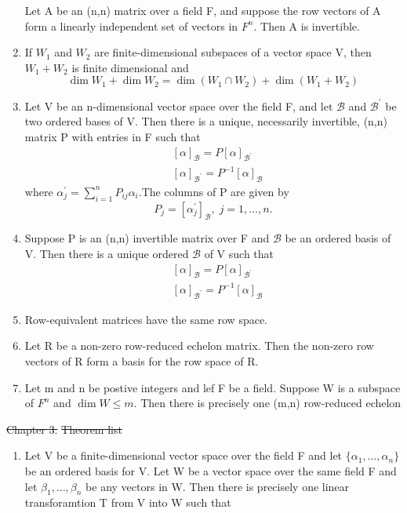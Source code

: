\documentclass[12pt, a4paper]{article}
\begin{document}
\begin{CJK*}{UTF8}{bsmi}
\begin{enumerate}
     Let A be an (n,n) matrix over a field F, and suppose the row vectors of A form a linearly independent set of vectors in \(F^n\). Then A is invertible.
    \item If \(W_1\) and \(W_2\) are finite-dimensional subspaces of a vector space V, then \(W_1+W_2\) is finite dimensional and \begin{equation}
        \dim W_1 + \dim W_2 = \dim{(W_1 \cap W_2)} + \dim(W_1+W_2) 
    \end{equation}
    \item Let V be an n-dimensional vector space over the field F, and let \(\mathscr{B}\) and \(\mathscr{B}^\prime\) be two ordered bases of V. Then there is a unique, necessarily invertible, (n,n) matrix P with entries in F such that\begin{align}
        &[\alpha]_\mathscr{B} = P [\alpha]_{\mathscr{B^\prime}}\\
        &[\alpha]_\mathscr{B^\prime} = P^{-1} [\alpha]_{\mathscr{B}}
    \end{align}
    where \(\alpha_j^\prime =\sum\limits_{i=1}^n P_{ij} \alpha_i\).The columns of P are given by\begin{equation}
        P_j = [\alpha_j^\prime]_{\mathscr{B}}, \; j=1,\ldots,n.
    \end{equation}
    \item Suppose P is an (n,n) invertible matrix over F and \(\mathscr{B}\) be an ordered basis of V. Then there is a unique ordered \(\mathscr{B}\) of V such that \begin{align}
        &[\alpha]_{\mathscr{B}} = P[\alpha]_{\mathscr{B^\prime}}\\
        &[\alpha]_{\mathscr{B^{\prime}}} = P^{-1}[\alpha]_{\mathscr{B}}
    \end{align}
    \item Row-equivalent matrices have the same row space.
    \item Let R be a non-zero row-reduced echelon matrix. Then the non-zero row vectors of R form a basis for the row space of R. 
    \item Let m and n be postive integers and lef F be a field. Suppose W is a subspace of \(F^n\) and \(\dim W\leq m\). Then there is precisely one (m,n) row-reduced echelon 
\end{enumerate}
\st{Chapter 3.}
\st{Theorem list}
\begin{enumerate}
    \item Let V be a finite-dimensional vector space over the field F and let \(\{\alpha_1,\ldots,\alpha_n\}\) be an ordered basis for V. Let W be a vector space over the same field F and let \(\beta_1,\ldots,\beta_n\) be any vectors in W. Then there is precisely one linear transforamtion T from V into W such that \begin{equation}

\end{equation}
\end{enumerate}
\end{CJK*}
\end{document}
